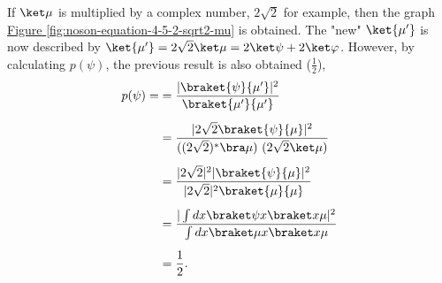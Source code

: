 If $\ket\mu$ is multiplied by a complex number, $2 \sqrt 2$ for example,
then the graph
\hyperref[fig:noson-equation-4-5-2-sqrt2-mu]{Figure \ref{fig:noson-equation-4-5-2-sqrt2-mu}}
is obtained.
The "new" $\ket{\mu'}$ is now described by
$\ket{\mu'} = 2 \sqrt2 \ket \mu = 2 \ket \psi + 2 \ket \varphi$.
However, by calculating $p(\psi)$, the previous result is also obtained ($\frac 1 2$),
\begin{align}
    p(\psi) = &= \frac{|\braket{\psi}{\mu'}|^2}{\braket{\mu'}{\mu'}} \\[5pt]
    &= \frac{|2 \sqrt2 \braket{\psi}{\mu}|^2}{( (2 \sqrt2)^* \bra \mu)\ (2 \sqrt2 \ket \mu)} \\[5pt]
    &= \frac{|2 \sqrt2|^2 |\braket{\psi}{\mu}|^2}{|2 \sqrt2|^2 \braket{\mu}{\mu}} \\[5pt]
    &= \frac{|\int dx \braket \psi x \braket x \mu|^2}{\int dx \braket \mu x \braket x \mu} \\[5pt]
    &= \frac 1 2 .
\end{align}

